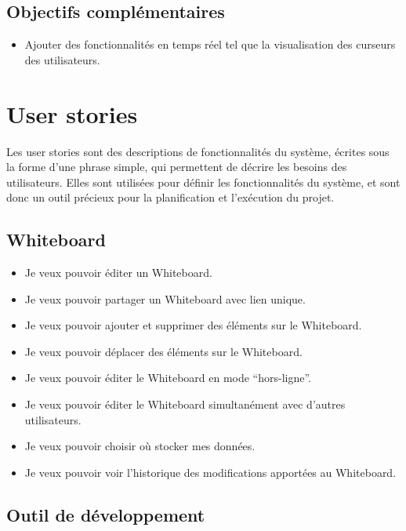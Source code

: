 \subsection*{Objectifs \guillemotleft complémentaires\guillemotright}

\begin{itemize}
    \item Ajouter des fonctionnalités en temps réel tel que la visualisation des curseurs des utilisateurs.
\end{itemize}

\section*{User stories}
Les user stories sont des descriptions de fonctionnalités du système, écrites sous la forme d'une phrase simple, qui permettent de décrire les besoins des utilisateurs. Elles sont utilisées pour définir les fonctionnalités du système, et sont donc un outil précieux pour la planification et l'exécution du projet.

\subsection*{Whiteboard \label{sec:user-stories-whiteboard}}

\begin{itemize}
    \item Je veux pouvoir éditer un Whiteboard.
    \item Je veux pouvoir partager un Whiteboard avec lien unique.
    \item Je veux pouvoir ajouter et supprimer des éléments sur le Whiteboard.
    \item Je veux pouvoir déplacer des éléments sur le Whiteboard.
    \item Je veux pouvoir éditer le Whiteboard en mode “hors-ligne”.
    \item Je veux pouvoir éditer le Whiteboard simultanément avec d'autres utilisateurs.
    \item Je veux pouvoir choisir où stocker mes données.
    \item Je veux pouvoir voir l'historique des modifications apportées au Whiteboard.
\end{itemize}

\subsection*{Outil de développement \label{sec:user-stories-devtools}}

